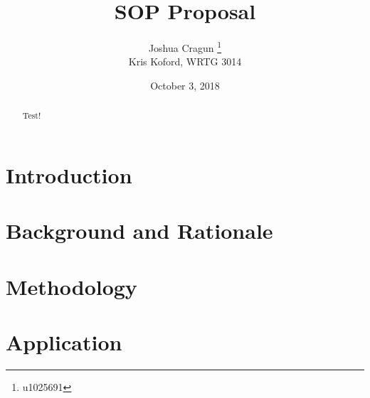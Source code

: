 \documentclass[12pt, letterpaper]{article}
\title{SOP Proposal}
\author{Joshua Cragun \thanks{u1025691} \\ Kris Koford, WRTG 3014 }
\date{October 3, 2018}
\begin{document}
\begin{titlepage}
\maketitle
\end{titlepage}

\tableofcontents
\newpage

\begin{abstract}
  Test!
\end{abstract}

\section{Introduction}

\section{Background and Rationale}

\section{Methodology}

\section{Application}
\end{document}
